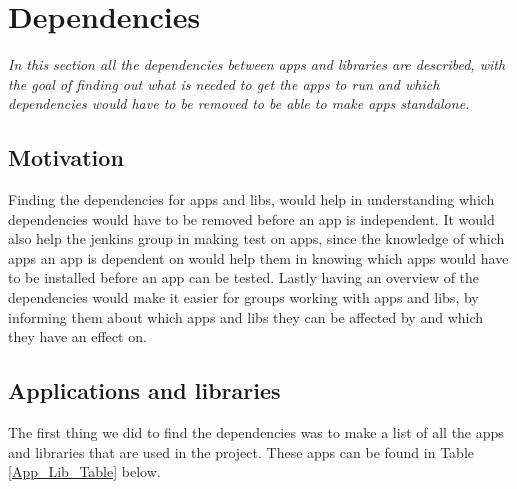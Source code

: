 \section{Dependencies}
\label{Sprint2_SecDependencies}
\textit{In this section all the dependencies between apps and libraries are described, with the goal of finding out what is needed to get the apps to run and which dependencies would have to be removed to be able to make apps standalone.}


\subsection{Motivation}
Finding the dependencies for apps and libs, would help in understanding which dependencies would have to be removed before an app is independent. It would also help the jenkins group in making test on apps, since the knowledge of which apps an app is dependent on would help them in knowing which apps would have to be installed before an app can be tested. Lastly having an overview of the dependencies would make it easier for groups working with apps and libs, by informing them about which apps and libs they can be affected by and which they have an effect on.


\subsection{Applications and libraries}
The first thing we did to find the dependencies was to make a list of all the apps and libraries that are used in the project. These apps can be found in Table \ref{App_Lib_Table} below.

